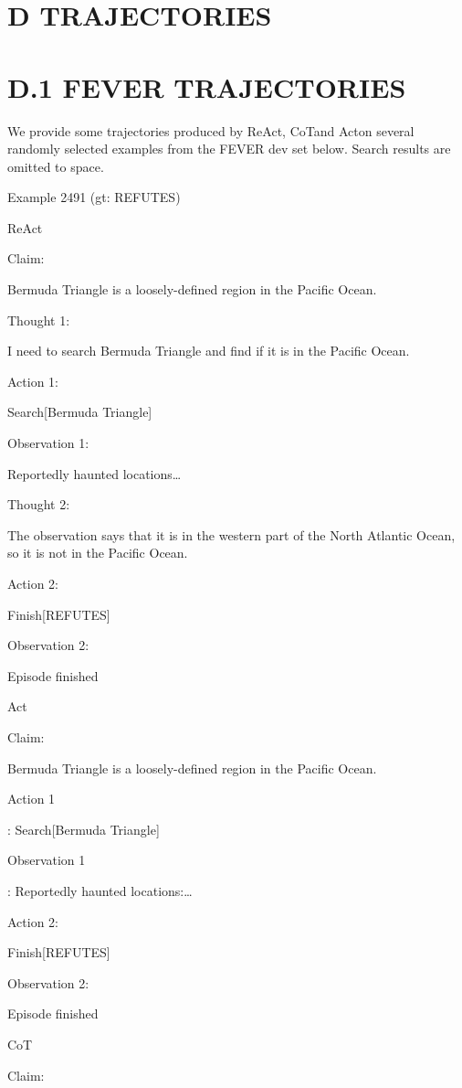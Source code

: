 \documentclass[
]{article}
\begin{document}
\section{D TRAJECTORIES}\label{d-trajectories}

\section{D.1 FEVER TRAJECTORIES}\label{d.1-fever-trajectories}

We provide some trajectories produced by ReAct, CoTand Acton several
randomly selected examples from the FEVER dev set below. Search results
are omitted to space.

Example 2491 (gt: REFUTES)

ReAct

Claim:

Bermuda Triangle is a loosely-defined region in the Pacific Ocean.

Thought 1:

I need to search Bermuda Triangle and find if it is in the Pacific
Ocean.

Action 1:

Search{[}Bermuda Triangle{]}

Observation 1:

Reportedly haunted locations\ldots{}

Thought 2:

The observation says that it is in the western part of the North
Atlantic Ocean, so it is not in the Pacific Ocean.

Action 2:

Finish{[}REFUTES{]}

Observation 2:

Episode finished

Act

Claim:

Bermuda Triangle is a loosely-defined region in the Pacific Ocean.

Action 1

: Search{[}Bermuda Triangle{]}

Observation 1

: Reportedly haunted locations:\ldots{}

Action 2:

Finish{[}REFUTES{]}

Observation 2:

Episode finished

CoT

Claim:
\end{document}
